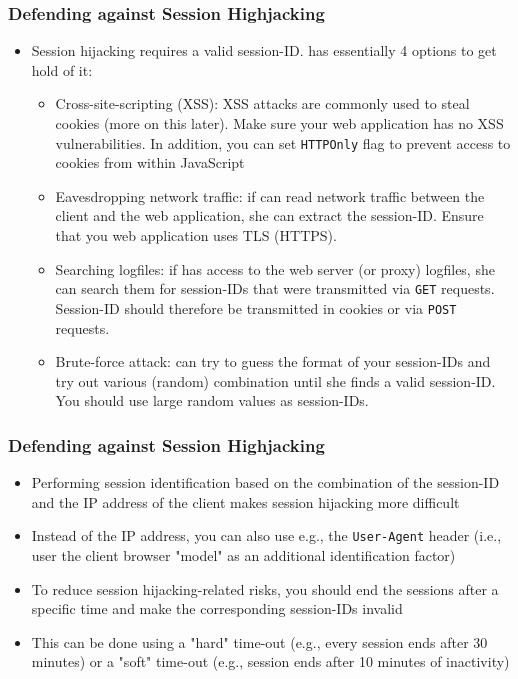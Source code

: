 \begin{frame}
    \frametitle{Defending against Session Highjacking}
    \begin{itemize}
        \item Session hijacking requires a valid session-ID. \Attacker has essentially 4 options to get hold of it:
        \begin{itemize}
            \item Cross-site-scripting (XSS): XSS attacks are commonly used to steal cookies (more on this later). Make sure your web application has no XSS vulnerabilities. In addition, you can set \texttt{HTTPOnly} flag to prevent access to cookies from within JavaScript 
            \item Eavesdropping network traffic: if \attacker can read network traffic between the client and the web application, she can extract the session-ID. Ensure that you web application uses TLS (HTTPS).
            \item Searching logfiles: if \attacker has access to the web server (or proxy) logfiles, she can search them for session-IDs that were transmitted via \texttt{GET} requests. Session-ID should therefore be transmitted in cookies or via \texttt{POST} requests.  
            \item Brute-force attack: \attacker can try to guess the format of your session-IDs and try out various (random) combination until she finds a valid session-ID. You should use large random values as session-IDs.
        \end{itemize}
    \end{itemize}
\end{frame}

\begin{frame}
    \frametitle{Defending against Session Highjacking}
    \begin{itemize}
        \item Performing session identification based on the combination of the session-ID and the IP address of the client makes session hijacking more difficult
        \item Instead of the IP address, you can also use e.g., the \texttt{User-Agent} header (i.e., user the client browser "model" as an additional identification factor)
        \item To reduce session hijacking-related risks, you should end the sessions after a specific time and make the corresponding session-IDs invalid
        \item This can be done using a "hard" time-out (e.g., every session ends after 30 minutes) or a "soft" time-out (e.g., session ends after 10 minutes of inactivity)
    \end{itemize}
\end{frame}



